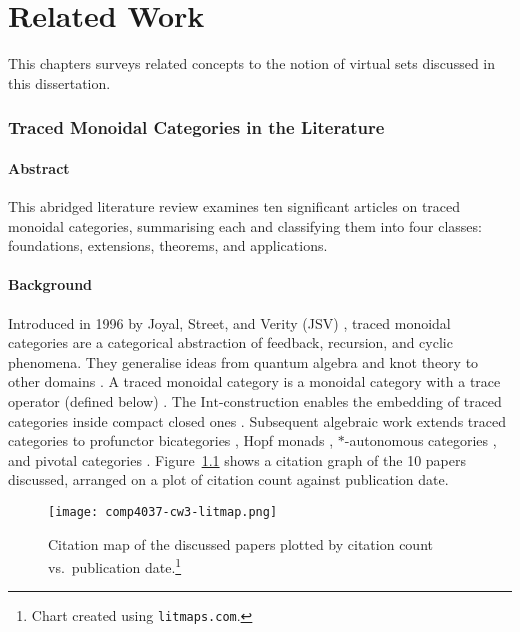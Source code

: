 \chapter{Related Work} \label{lit-review}

This chapters surveys related concepts to the notion of virtual sets
discussed in this dissertation.

\subsection{Traced Monoidal Categories in the Literature}
\subsubsection*{Abstract}
This abridged literature review examines ten significant articles on traced
monoidal categories, summarising each and classifying them into four classes:
foundations, extensions, theorems, and applications.
\subsubsection*{Background}
Introduced in 1996 by Joyal, Street, and Verity (JSV)
\cite{joyal1996-traced-monoidal-categories}, traced monoidal categories are a
categorical abstraction of feedback, recursion, and cyclic phenomena. They
generalise ideas from quantum algebra and knot theory to other domains
\cite{reshetikhin1990-ribbon-graphs-invaraints}. A traced monoidal category is a
monoidal category with a trace operator (defined below)
\cite{hu2021-traced-monoidal-categories}. The $\mathrm{Int}$-construction
enables the embedding of traced categories inside compact closed ones
\cite{joyal1996-traced-monoidal-categories}. Subsequent algebraic work extends
traced categories to profunctor bicategories
\cite{hu2021-traced-monoidal-categories}, Hopf monads
\cite{bruguieres2011-hopf-monads-monoidal}, $*$-autonomous categories
\cite{hajgato2013-traced-autonomous-categories}, and pivotal categories
\cite{etingof2005-fusion-categories}. Figure~\ref{fig:litmap} shows a citation graph of the
10 papers discussed, arranged on a plot of citation count against publication
date.
\begin{figure}[ht]
	\centering
	\texttt{[image: comp4037-cw3-litmap.png]}
	\caption{Citation map of the discussed papers plotted by citation count vs.\ publication date.\protect\footnote{Chart created using \texttt{litmaps.com}.}}
	\label{fig:litmap}
\end{figure}
